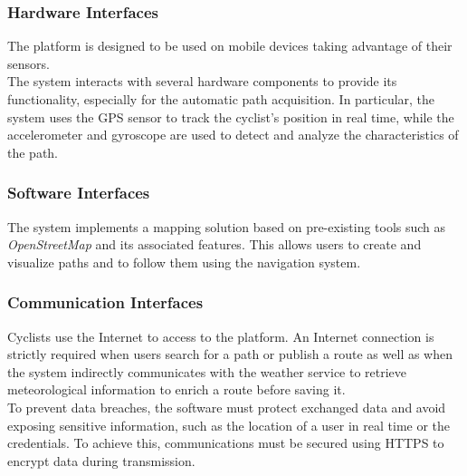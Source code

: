 \subsubsection{Hardware Interfaces} 
The platform is designed to be used on mobile devices taking advantage of their sensors.\\
The system interacts with several hardware components to provide its functionality, especially for the automatic path acquisition. In particular, the system uses the GPS sensor to track the cyclist's position in real time, while the accelerometer and gyroscope are used to detect and analyze the characteristics of the path.
\subsubsection{Software Interfaces}
The system implements a mapping solution based on pre-existing tools such as \textit{OpenStreetMap} and its associated features. This allows users to create and visualize paths and to follow them using the navigation system.  
\subsubsection{Communication Interfaces}
Cyclists use the Internet to access to the platform. An Internet connection is strictly required when users search for a path or publish a route as well as when the system indirectly communicates with the weather service to retrieve meteorological information to enrich a route before saving it. \\
To prevent data breaches, the software must protect exchanged data and avoid exposing sensitive information, such as the location of a user in real time or the credentials. To achieve this, communications must be secured using HTTPS to encrypt data during transmission. 
